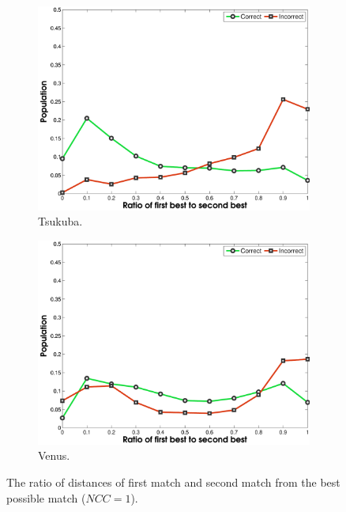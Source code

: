 \documentclass[letterpaper,12pt]{article}
\begin{document}
\begin{figure}[!h]
\begin{subfigure}[b]{0.48\textwidth}
         \end{subfigure}
         \\
        \begin{subfigure}[b]{0.48\textwidth}
                \includegraphics[width=\textwidth]{rat_w_tsukuba.pdf}
                \caption{Tsukuba.}
        \end{subfigure}
        \begin{subfigure}[b]{0.48\textwidth}
                \includegraphics[width=\textwidth]{rat_w_venus.pdf}
                \caption{Venus.}
        \end{subfigure}
        \caption{The ratio of distances of first match and second match from the best possible match ($NCC=1$).}
        \label{fig:rat}
\end{figure}
\end{document}
